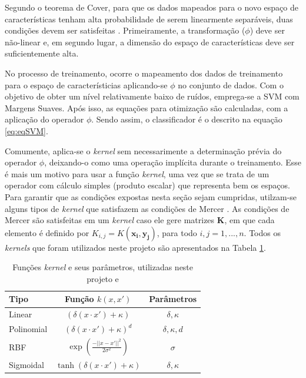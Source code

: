 Segundo o teorema de Cover, para que os dados mapeados para o novo espaço de características tenham alta probabilidade de serem linearmente separáveis, duas condições devem ser satisfeitas . Primeiramente, a transformação ($\phi$) deve ser não-linear e, em segundo lugar, a dimensão do espaço de características deve ser suficientemente alta.

No processo de treinamento, ocorre o mapeamento dos dados de treinamento para o espaço de característicias aplicando-se $\phi$ no conjunto de dados. Com o objetivo de obter um nível relativamente baixo de ruídos, emprega-se a SVM com Margens Suaves. Após isso, as equações para otimização são calculadas, com a aplicação do operador $\phi$. Sendo assim, o classificador é o descrito na equação \ref{eq:eqSVM}.

Comumente, aplica-se o \textit{kernel} sem necessarimente a determinação prévia do operador $\phi$, deixando-o como uma operação implícita durante o treinamento. Esse é mais um motivo para usar a função \textit{kernel}, uma vez que se trata de um operador com cálculo simples (produto escalar) que representa bem os espaços. Para garantir que as condições expostas nesta seção sejam cumpridas, utilzam-se alguns tipos de \textit{kernel} que satisfazem as condições de Mercer . As condições de Mercer são satisfeitas em um \textit{kernel} caso ele gere matrizes $\boldsymbol{K}$, em que cada elemento é definido por $K_{i,j}=K(\boldsymbol{x_i},\boldsymbol{y_j})$, para todo $i,j = 1,...,n$. Todos os \textit{kernels} que foram utilizados neste projeto são apresentados na Tabela \ref{tab:svmkernel}.

\begin{table}[h]
 \centering
 \begin{tabular}{l|c|c}
    Tipo & Função $k(x,x')$ & Parâmetros\\
  \hline
  Linear &  $(\delta(x \cdot x') + \kappa)$ & $\delta,\kappa$ \\
  Polinomial &  $(\delta(x \cdot x') + \kappa)^d$ & $\delta,\kappa, d$  \\
  RBF & $\exp(\frac{-||x - x'||^2}{2\sigma^2})$ & $\sigma$ \\
  Sigmoidal & $\tanh(\delta(x \cdot x') + \kappa)$ & $\delta,\kappa$ \\
 \end{tabular}
 \caption{Funções \textit{kernel} e seus parâmetros, utilizadas neste projeto  e }
 \label{tab:svmkernel}
\end{table}

